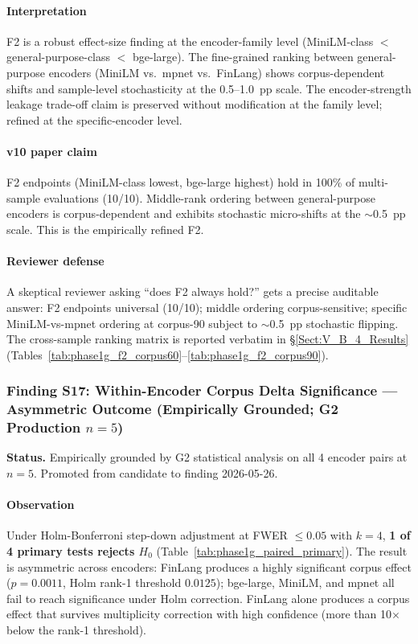 \documentclass[journal]{IEEEtran}
\begin{document}
\paragraph{Interpretation}
F2 is a robust effect-size finding at the encoder-family level (MiniLM-class $<$ general-purpose-class $<$ bge-large). The fine-grained ranking between general-purpose encoders (MiniLM vs.\ mpnet vs.\ FinLang) shows corpus-dependent shifts and sample-level stochasticity at the 0.5--1.0~pp scale. The encoder-strength leakage trade-off claim is preserved without modification at the family level; refined at the specific-encoder level.

\paragraph{v10 paper claim}
F2 endpoints (MiniLM-class lowest, bge-large highest) hold in 100\% of multi-sample evaluations (10/10). Middle-rank ordering between general-purpose encoders is corpus-dependent and exhibits stochastic micro-shifts at the $\sim$0.5~pp scale. This is the empirically refined F2.

\paragraph{Reviewer defense}
A skeptical reviewer asking ``does F2 always hold?'' gets a precise auditable answer: F2 endpoints universal (10/10); middle ordering corpus-sensitive; specific MiniLM-vs-mpnet ordering at corpus-90 subject to $\sim$0.5~pp stochastic flipping. The cross-sample ranking matrix is reported verbatim in \S\ref{Sect:V_B_4_Results} (Tables~\ref{tab:phase1g_f2_corpus60}--\ref{tab:phase1g_f2_corpus90}).

\subsubsection{Finding S17: Within-Encoder Corpus Delta Significance --- Asymmetric Outcome (Empirically Grounded; G2 Production $n{=}5$)}
\label{Sect:V_B_5_3_S17}

\textbf{Status.} Empirically grounded by G2 statistical analysis on all 4 encoder pairs at $n{=}5$. Promoted from candidate to finding 2026-05-26.

\paragraph{Observation}
Under Holm-Bonferroni step-down adjustment at FWER $\leq 0.05$ with $k{=}4$, \textbf{1 of 4 primary tests rejects $H_0$} (Table~\ref{tab:phase1g_paired_primary}). The result is asymmetric across encoders: FinLang produces a highly significant corpus effect ($p{=}0.0011$, Holm rank-1 threshold $0.0125$); bge-large, MiniLM, and mpnet all fail to reach significance under Holm correction. FinLang alone produces a corpus effect that survives multiplicity correction with high confidence (more than 10$\times$ below the rank-1 threshold).
\end{document}
